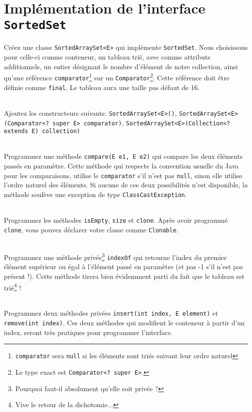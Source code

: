 \documentclass[iutinfo,a4paper,10pt]{ustl-tdtp}
\begin{document}
\section{Implémentation de l'interface \texttt{SortedSet}}

\question Créez une classe \texttt{SortedArraySet<E>} qui implémente \texttt{SortedSet}. Nous choisissons pour celle-ci comme conteneur, un tableau trié, avec comme attributs additionnels, un entier désignant le nombre d'élément de notre collection, ainsi qu'une référence \texttt{comparator}\footnote{\texttt{comparator} sera \texttt{null} si les éléments sont triés suivant leur ordre naturel} sur un \texttt{Comparator}\footnote{Le type exact est \texttt{Comparator<? super E>}.}. Cette référence doit être définie comme \texttt{final}. Le tableau aura une taille pas défaut de 16.

~\\ \question Ajoutez les constructeurs suivants: \texttt{SortedArraySet<E>()}, 
\texttt{SortedArraySet<E>(Comparator<? super E> comparator)}, 
\texttt{SortedArraySet<E>(Collection<? extends E) collection)} 

~\\ \question Programmez une méthode \texttt{compare(E e1, E e2)} qui compare les deux éléments passés en paramètre. Cette méthode qui respecte la convention usuelle du Java pour les comparaisons, utilise le \texttt{comparator} s'il n'est pas \texttt{null}, sinon elle utilise l'ordre naturel des éléments. Si aucune de ces deux possibilités n'est disponible, la méthode soulève une exception de type \texttt{ClassCastException}.

~\\ \question Programmez les méthodes \texttt{isEmpty},  \texttt{size} et \texttt{clone}. Après avoir programmé \texttt{clone}, vous pouvez déclarer votre classe comme \texttt{Clonable}.

~\\ \question Programmez une méthode privée\footnote{Pourquoi faut-il absolument qu'elle soit privée ?} \texttt{indexOf} qui retourne l'index du premier élément supérieur ou égal à l'élément passé en paramètre (et pas -1 s'il n'est pas présent !). Cette méthode tirera bien évidemment parti du fait que le tableau est trié\footnote{Vive le retour de la dichotomie...} ! 

~\\ \question Programmez deux méthodes privées \texttt{insert(int index, E element)} et \texttt{remove(int index)}. Ces deux méthodes qui modifient le conteneur à partir d'un index, seront très pratiques pour programmer l'interface.
\end{document}
